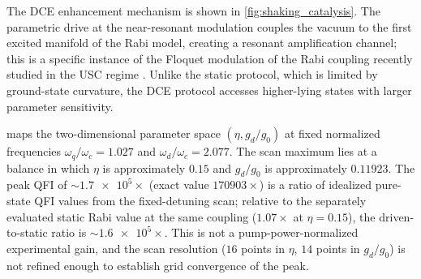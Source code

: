 \documentclass[aps,prxquantum,preprint,superscriptaddress,amsmath,amssymb]{revtex4-2}
\begin{document}
The DCE enhancement mechanism is shown in \cref{fig:shaking_catalysis}. The parametric drive at the near-resonant modulation couples the vacuum to the first excited manifold of the Rabi model, creating a resonant amplification channel; this is a specific instance of the Floquet modulation of the Rabi coupling recently studied in the USC regime \cite{Akbari2025}. Unlike the static protocol, which is limited by ground-state curvature, the DCE protocol accesses higher-lying states with larger parameter sensitivity.

 maps the two-dimensional parameter space $(\eta, g_d/g_0)$ at fixed normalized frequencies $\omega_q/\omega_c = \num{1.027}$ and $\omega_d/\omega_c = \num{2.077}$. The scan maximum lies at a balance in which $\eta$ is approximately $\num{0.15}$ and $g_d/g_0$ is approximately $\num{0.11923}$. The peak QFI of $\sim\!\num{1.7e5}\times$ (exact value $\num{170903}\times$) is a ratio of idealized pure-state QFI values from the fixed-detuning scan; relative to the separately evaluated static Rabi value at the same coupling ($\num{1.07}\times$ at $\eta=\num{0.15}$), the driven-to-static ratio is $\sim\!\num{1.6e5}\times$. This is not a pump-power-normalized experimental gain, and the scan resolution ($16$ points in $\eta$, $14$ points in $g_d/g_0$) is not refined enough to establish grid convergence of the peak.
\end{document}

